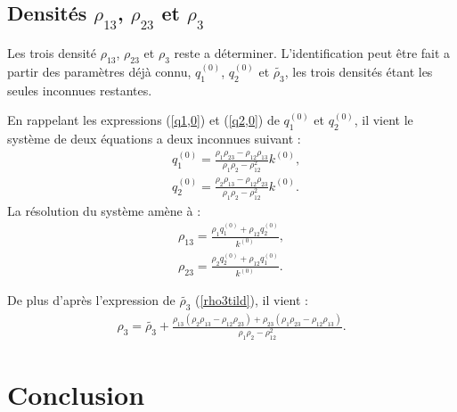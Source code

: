 \documentclass[12pt]{report}
\begin{document}
\subsection{Densités $\rho_{13}$, $\rho_{23}$ et $\rho_3$}
\label{Ch_Inv_S_rho_SS_rho13/23/3}
    Les trois densité $\rho_{13}$, $\rho_{23}$ et $\rho_3$ reste a déterminer. L'identification peut être fait a partir des paramètres déjà connu, $q_1^{(0)}$, $q_2^{(0)}$ et $\tilde{\rho_3}$, les trois densités étant les seules inconnues restantes.
    
    En rappelant les expressions (\ref{q1,0}) et (\ref{q2,0}) de $q_1^{(0)}$ et $q_2^{(0)}$, il vient le système de deux équations a deux inconnues suivant :
    \begin{align*}
    &q_1^{(0)}=\frac{\rho_1\rho_{23}-\rho_{12}\rho_{13}}{\rho_1\rho_2-\rho_{12}^2}k^{(0)},\\
    &q_2^{(0)}=\frac{\rho_2\rho_{13}-\rho_{12}\rho_{23}}{\rho_1\rho_2-\rho_{12}^2}k^{(0)}.
    \end{align*}
    La résolution du système amène à :
    \begin{align*}
    \rho_{13}=\frac{\rho_1q_1^{(0)}+\rho_{12}q_2^{(0)}}{k^{(0)}},\\
    \rho_{23}=\frac{\rho_2q_2^{(0)}+\rho_{12}q_1^{(0)}}{k^{(0)}}.
    \end{align*}

    De plus d'après l'expression de $\tilde{\rho_3}$ (\ref{rho3tild}), il vient :
    \begin{align}
    \rho_3=\tilde{\rho_3}+\frac{\rho_{13}(\rho_2\rho_{13}-\rho_{12}\rho_{23})+\rho_{23}(\rho_1\rho_{23}-\rho_{12}\rho_{13})}{\rho_1\rho_2-\rho_{12}^2}.
    \end{align}
    
\section{Conclusion}
\label{Ch_Inv_S_Conc}
    
    
    
\end{document}
